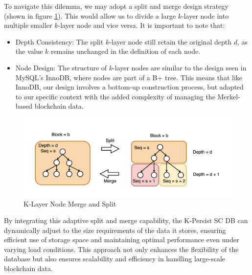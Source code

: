 To navigate this dilemma, we may adopt a split and merge design strategy (shown in figure \ref{fig:k_layer_node_merge_split}). This would allow us to divide a large $k$-layer node into multiple smaller $k$-layer node and vice versa. It is important to note that:

\begin{itemize}
    \item Depth Consistency: The split $k$-layer node still retain the original depth $d$, as the value $k$ remains unchanged in the definition of each node.
    \item Node Design: The structure of $k$-layer nodes are similar to the design seen in MySQL's InnoDB, where nodes are part of a B+ tree. This means that like InnoDB, our design involves a bottom-up construction process, but adapted to our specific context with the added complexity of managing the Merkel-based blockchain data.
\end{itemize}

\begin{figure}[htp]
  \centering
  \includegraphics[width=\columnwidth]{sections/images/k-persist-layer-merge-split.png}
  \caption{K-Layer Node Merge and Split}
  \label{fig:k_layer_node_merge_split}
\end{figure}

By integrating this adaptive split and merge capability, the K-Persist SC DB can dynamically adjust to the size requirements of the data it stores, ensuring efficient use of storage space and maintaining optimal performance even under varying load conditions. This approach not only enhances the flexibility of the database but also ensures scalability and efficiency in handling large-scale blockchain data.